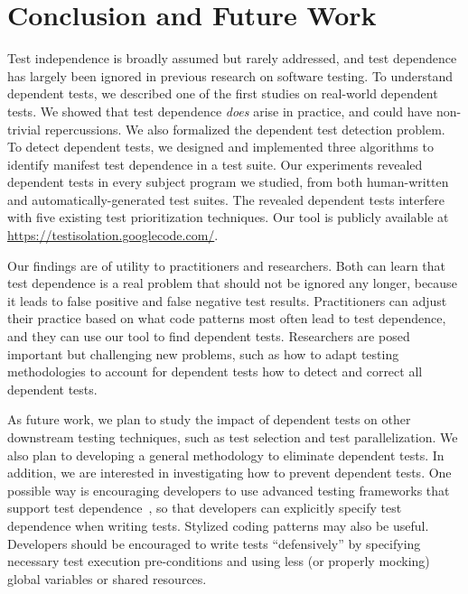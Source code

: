 
\vspace{-1mm}
\section{Conclusion and Future Work}
\label{sec:questions}


Test independence is broadly assumed but rarely addressed, and
test dependence has largely been ignored in previous
research on software testing. 
To understand dependent tests, we described one of the first studies on
real-world dependent tests. We showed that 
test dependence \textit{does} arise in practice, and could 
have non-trivial repercussions. We also
formalized the dependent test detection
problem. To detect dependent tests, we designed
and implemented three algorithms to identify manifest test dependence
in a test suite. Our experiments revealed
dependent tests in every subject program
we studied, from both human-written and automatically-generated test
suites. The revealed dependent tests interfere with
five existing test prioritization techniques.
Our tool is publicly available at
\url{https://testisolation.googlecode.com/}.

Our findings are of utility to practitioners and researchers.
Both can learn that test dependence is a real problem that should not be
ignored any longer, because it leads to false positive and false negative
test results.
Practitioners can adjust their practice based on what code patterns most
often lead to test dependence, and they can use our tool to 
find dependent tests.
Researchers are posed important but challenging new problems, such as how
to adapt testing methodologies to account for dependent tests how to detect
and correct all dependent tests.

\enlargethispage{5pt}

As future work, we plan to study
the impact of dependent tests on other
downstream testing techniques, such as test selection and
test parallelization.
We also plan to developing
a general methodology to eliminate dependent tests.
In addition, we are interested in investigating how to
prevent dependent tests.
%
One possible way is encouraging developers to
use advanced testing frameworks that support test dependence~\cite{testng},
so that developers can explicitly specify test
dependence when writing tests.
%
Stylized coding patterns may also be useful. Developers
should be encouraged to write tests ``defensively'' by
specifying necessary test execution pre-conditions and
using less (or properly mocking) global variables or shared resources. 

